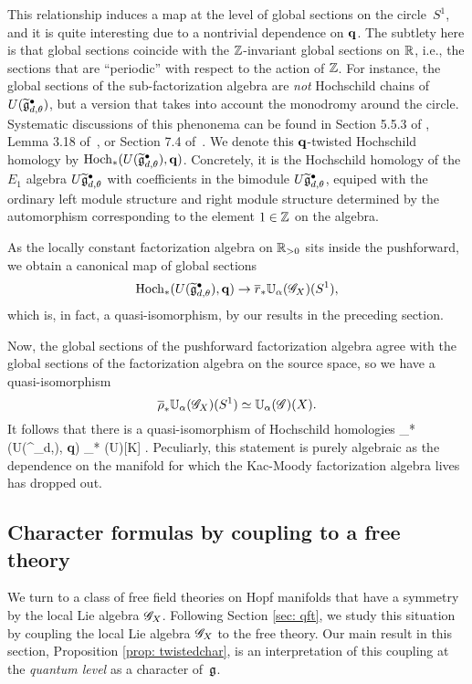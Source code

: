 This relationship induces a map at the level of global sections on the circle~$S^1$,
and it is quite interesting due to a nontrivial dependence on ${\bf q}$.
The subtlety here is that global sections coincide with the $\mathbb Z$-invariant global sections on $\mathbb R$, 
i.e., the sections that are ``periodic'' with respect to the action of $\mathbb Z$.
For instance, the global sections of the sub-factorization algebra are {\em not} Hochschild chains of $U(\widetilde{\mathfrak g}^\bullet_{d,\theta})$, 
but a version that takes into account the monodromy around the circle.
Systematic discussions of this phenonema can be found in Section 5.5.3 of \cite{LurieHA}, Lemma 3.18 of~\cite{AFTopMan}, or Section 7.4 of~\cite{CG1}.
We denote this ${\bf q}$-twisted Hochschild homology by ${\rm Hoch}_*(U(\widetilde{\mathfrak g}^\bullet_{d,\theta}), {\bf q})$.
Concretely, it is the Hochschild homology of the $E_1$ algebra $U \widetilde{\mathfrak g}_{d,\theta}^\bullet$ with coefficients in the bimodule $U \widetilde{\mathfrak g}_{d, \theta}^\bullet$, equiped with the ordinary left module structure and right module structure determined by the automorphism corresponding to the element $1 \in \mathbb Z$ on the algebra.

As the locally constant factorization algebra on $\mathbb R_{>0}$ sits inside the pushforward, 
we obtain a canonical map of global sections
\[
{\rm Hoch}_*(U(\widetilde{\mathfrak g}^\bullet_{d,\theta}), {\bf q}) \to \overline{r}_* \mathbb U_\alpha(\mathscr G_X) (S^1) ,
\]
which is, in fact, a quasi-isomorphism, by our results in the preceding section. 

Now, the global sections of the pushforward factorization algebra agree with the global sections of the factorization algebra on the source space,
so we have a quasi-isomorphism
\[
\overline{\rho}_* \mathbb U_\alpha(\mathscr G_X) (S^1) \simeq \mathbb U_{\alpha} (\mathscr G)(X) .
\]
It follows that there is a quasi-isomorphism of Hochschild homologies
\beqn\label{hoch1}
\Hoch_*(U(\Tilde{\fg}^\bullet_{d,\theta}), {\bf q}) \simeq \Hoch_* (U\fg)[K] .
\eeqn
Peculiarly, this statement is purely algebraic as the dependence on the manifold for which the Kac-Moody factorization algebra lives has dropped out.

\subsection{Character formulas by coupling to a free theory}

\def\Cl{{\rm Cl}}

We turn to a class of free field theories on Hopf manifolds that have a symmetry by the local Lie algebra $\mathscr G_X$. 
Following Section \ref{sec: qft}, we study this situation by coupling the local Lie algebra $\mathscr G_X$ to the free theory.
Our main result in this section, Proposition \ref{prop: twistedchar}, is an interpretation of this coupling at the {\em quantum level} as a character of~$\mathfrak g$. 

